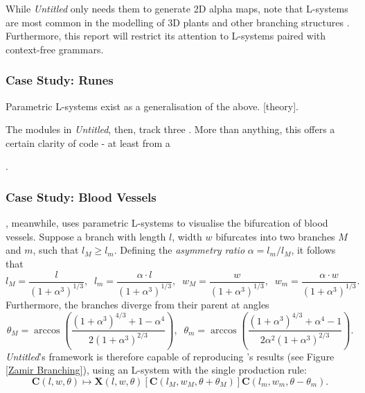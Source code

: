 \documentclass[a4paper, 11pt]{article}
\begin{document}
\begin{flushleft}
\vspace{5pt}\noindent
While \textit{Untitled} only needs them to generate 2D alpha maps, note that L-systems are most common in the modelling of 3D plants and other branching structures \citep{prusinkiewiczAlgorithmicBeauty}. Furthermore, this report will restrict its attention to L-systems paired with context-free grammars.

\subsubsection{Case Study: Runes}

Parametric L-systems \citep{hananParametricLSystems} exist as a generalisation of the above. [theory].

\vspace{5pt}\noindent
The modules in \textit{Untitled}, then, track three . More than anything, this offers a certain clarity of code - at least from a 

\vspace{5pt}.

\subsubsection{Case Study: Blood Vessels} %

\citet{zamirArterialBranchingLSystems}, meanwhile, uses parametric L-systems to visualise the bifurcation of blood vessels. Suppose a branch with length $l$, width $w$ bifurcates into two branches $M$ and $m$, such that $l_M \geq l_m$. Defining the \textit{asymmetry ratio} $\alpha = l_m/l_M$, it follows that
$$l_M = \frac{l}{\left(1+\alpha^3\right)^{1/3}}, \;\; l_m = \frac{\alpha\cdot l}{\left(1+\alpha^3\right)^{1/3}}, \;\; w_M = \frac{w}{\left(1+\alpha^3\right)^{1/3}}, \;\; w_m = \frac{\alpha\cdot w}{\left(1+\alpha^3\right)^{1/3}}.$$
Furthermore, the branches diverge from their parent at angles
$$\theta_M = \arccos\left(\frac{\left(1+\alpha^3\right)^{4/3}+1-\alpha^4}{2\left(1+\alpha^3\right)^{2/3}}\right), \;\; \theta_m = \arccos\left(\frac{\left(1+\alpha^3\right)^{4/3}+\alpha^4-1}{2\alpha^2\left(1+\alpha^3\right)^{2/3}}\right).$$
\textit{Untitled}'s framework is therefore capable of reproducing \citeauthor{zamirArterialBranchingLSystems}'s results (see Figure \ref{Zamir Branching}), using an L-system with the single production rule:  
$$\mathbf{C}(l,w,\theta) \mapsto \mathbf{X}(l,w,\theta)[\mathbf{C}(l_M,w_M,\theta+\theta_M)]\mathbf{C}(l_m,w_m,\theta-\theta_m).$$


\end{flushleft}
\end{document}
